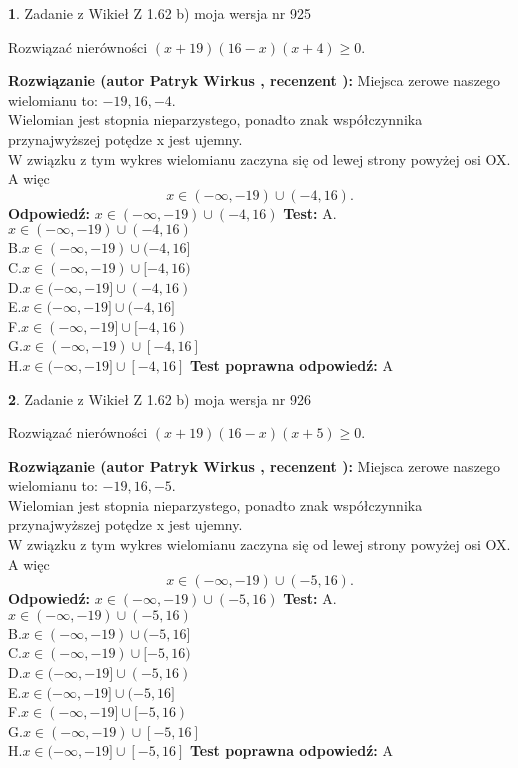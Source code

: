 \documentclass[12pt, a4paper]{article}
\theoremstyle{definition} %
\newtheorem{zad}{}
\newcommand{\zadStart}[1]{\begin{zad}#1\newline}
\newcommand{\zadStop}{\end{zad}}
\newcommand{\rozwStart}[2]{\noindent \textbf{Rozwiązanie (autor #1 , recenzent #2): }\newline}
\newcommand{\rozwStop}{\newline}
\newcommand{\odpStart}{\noindent \textbf{Odpowiedź:}\newline}
\newcommand{\odpStop}{\newline}
\newcommand{\testStart}{\noindent \textbf{Test:}\newline}
\newcommand{\testStop}{\newline}
\newcommand{\kluczStart}{\noindent \textbf{Test poprawna odpowiedź:}\newline}
\newcommand{\kluczStop}{\newline}
\begin{document}
\zadStart{Zadanie z Wikieł Z 1.62 b) moja wersja nr 925}

Rozwiązać nierówności $(x+19)(16-x)(x+4)\ge0$.
\zadStop
\rozwStart{Patryk Wirkus}{}
Miejsca zerowe naszego wielomianu to: $-19, 16, -4$.\\
Wielomian jest stopnia nieparzystego, ponadto znak współczynnika przy\linebreak najwyższej potędze x jest ujemny.\\ W związku z tym wykres wielomianu zaczyna się od lewej strony powyżej osi OX. A więc $$x \in (-\infty,-19) \cup (-4,16).$$
\rozwStop
\odpStart
$x \in (-\infty,-19) \cup (-4,16)$
\odpStop
\testStart
A.$x \in (-\infty,-19) \cup (-4,16)$\\
B.$x \in (-\infty,-19) \cup (-4,16]$\\
C.$x \in (-\infty,-19) \cup [-4,16)$\\
D.$x \in (-\infty,-19] \cup (-4,16)$\\
E.$x \in (-\infty,-19] \cup (-4,16]$\\
F.$x \in (-\infty,-19] \cup [-4,16)$\\
G.$x \in (-\infty,-19) \cup [-4,16]$\\
H.$x \in (-\infty,-19] \cup [-4,16]$
\testStop
\kluczStart
A
\kluczStop



\zadStart{Zadanie z Wikieł Z 1.62 b) moja wersja nr 926}

Rozwiązać nierówności $(x+19)(16-x)(x+5)\ge0$.
\zadStop
\rozwStart{Patryk Wirkus}{}
Miejsca zerowe naszego wielomianu to: $-19, 16, -5$.\\
Wielomian jest stopnia nieparzystego, ponadto znak współczynnika przy\linebreak najwyższej potędze x jest ujemny.\\ W związku z tym wykres wielomianu zaczyna się od lewej strony powyżej osi OX. A więc $$x \in (-\infty,-19) \cup (-5,16).$$
\rozwStop
\odpStart
$x \in (-\infty,-19) \cup (-5,16)$
\odpStop
\testStart
A.$x \in (-\infty,-19) \cup (-5,16)$\\
B.$x \in (-\infty,-19) \cup (-5,16]$\\
C.$x \in (-\infty,-19) \cup [-5,16)$\\
D.$x \in (-\infty,-19] \cup (-5,16)$\\
E.$x \in (-\infty,-19] \cup (-5,16]$\\
F.$x \in (-\infty,-19] \cup [-5,16)$\\
G.$x \in (-\infty,-19) \cup [-5,16]$\\
H.$x \in (-\infty,-19] \cup [-5,16]$
\testStop
\kluczStart
A
\kluczStop
\end{document}
